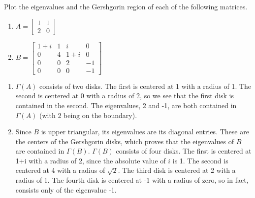 \documentclass{ximera}
\begin{document}
\begin{example}\label{exa:plot_Gersh}
Plot the eigenvalues and the Gershgorin region of each of the following matrices.
\begin{enumerate}
    \item $A=\begin{bmatrix}
    1 & 1 \\
    2 & 0 \end{bmatrix}$
    \item $B=\begin{bmatrix}
    1+i & 1 & i & 0\\ 
    0 & 4 & 1+i & 0\\ 
    0 & 0 & 2 & -1 \\
    0 & 0 & 0 & -1\end{bmatrix}$
\end{enumerate}

\begin{explanation}

\begin{enumerate}
    \item $\Gamma(A)$ consists of two disks.  The first is centered at 1 with a radius of 1.  The second is centered at 0 with a radius of 2, so we see that the first disk is contained in the second.  The eigenvalues, 2 and -1, are both contained in $\Gamma(A)$ (with 2 being on the boundary).
    \item Since $B$ is upper triangular, its eigenvalues are its diagonal entries.  These are the centers of the Gershgorin disks, which proves that the eigenvalues of $B$ are contained in $\Gamma(B)$.  $\Gamma(B)$ consists of four disks.  The first is centered at 1+i with a radius of $2$, since the absolute value of $i$ is 1.   The second is centered at 4 with a radius of $\sqrt{2}$.  The third disk is centered at 2 with a radius of 1.  The fourth disk is centered at -1 with a radius of zero, so in fact, consists only of the eigenvalue -1.
\end{enumerate}

\end{explanation}
\end{example}
\end{document}
